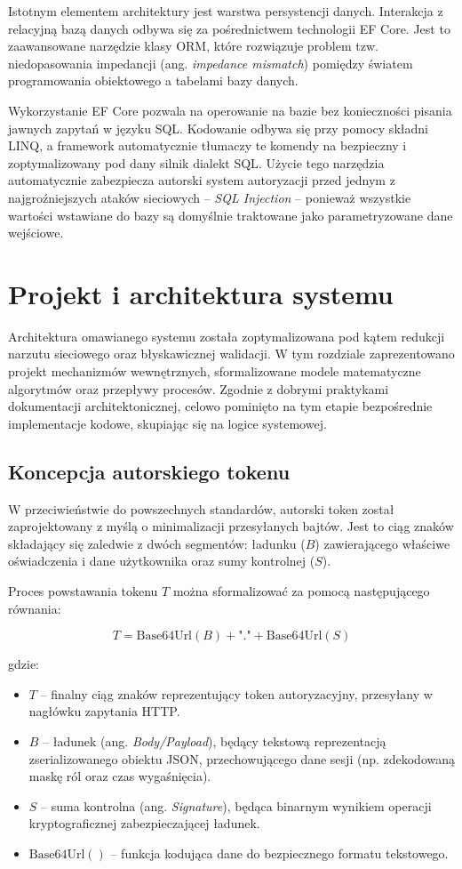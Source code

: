 \documentclass{SGGW-thesis}
\begin{document}
Istotnym elementem architektury jest warstwa persystencji danych. Interakcja z relacyjną bazą danych odbywa się za pośrednictwem technologii EF Core. Jest to zaawansowane narzędzie klasy ORM, które rozwiązuje problem tzw. niedopasowania impedancji (ang. \textit{impedance mismatch}) pomiędzy światem programowania obiektowego a tabelami bazy danych.

Wykorzystanie EF Core pozwala na operowanie na bazie bez konieczności pisania jawnych zapytań w języku SQL. Kodowanie odbywa się przy pomocy składni LINQ, a framework automatycznie tłumaczy te komendy na bezpieczny i zoptymalizowany pod dany silnik dialekt SQL. Użycie tego narzędzia automatycznie zabezpiecza autorski system autoryzacji przed jednym z najgroźniejszych ataków sieciowych – \textit{SQL Injection} – ponieważ wszystkie wartości wstawiane do bazy są domyślnie traktowane jako parametryzowane dane wejściowe.
\clearpage

\startchapterfromoddpage
\chapter{Projekt i architektura systemu}

Architektura omawianego systemu została zoptymalizowana pod kątem redukcji narzutu sieciowego oraz błyskawicznej walidacji. W tym rozdziale zaprezentowano projekt mechanizmów wewnętrznych, sformalizowane modele matematyczne algorytmów oraz przepływy procesów. Zgodnie z dobrymi praktykami dokumentacji architektonicznej, celowo pominięto na tym etapie bezpośrednie implementacje kodowe, skupiając się na logice systemowej.

\section{Koncepcja autorskiego tokenu}

W przeciwieństwie do powszechnych standardów, autorski token został zaprojektowany z myślą o minimalizacji przesyłanych bajtów. Jest to ciąg znaków składający się zaledwie z dwóch segmentów: ładunku ($B$) zawierającego właściwe oświadczenia i dane użytkownika oraz sumy kontrolnej ($S$). 

Proces powstawania tokenu $T$ można sformalizować za pomocą następującego równania:

$$ T = \text{Base64Url}(B) + \text{"."} + \text{Base64Url}(S) $$

gdzie:
\begin{itemize}
    \item $T$ – finalny ciąg znaków reprezentujący token autoryzacyjny, przesyłany w nagłówku zapytania HTTP.
    \item $B$ – ładunek (ang. \textit{Body/Payload}), będący tekstową reprezentacją zserializowanego obiektu JSON, przechowującego dane sesji (np. zdekodowaną maskę ról oraz czas wygaśnięcia).
    \item $S$ – suma kontrolna (ang. \textit{Signature}), będąca binarnym wynikiem operacji kryptograficznej zabezpieczającej ładunek.
    \item $\text{Base64Url}()$ – funkcja kodująca dane do bezpiecznego formatu tekstowego.
\end{itemize}
\end{document}

